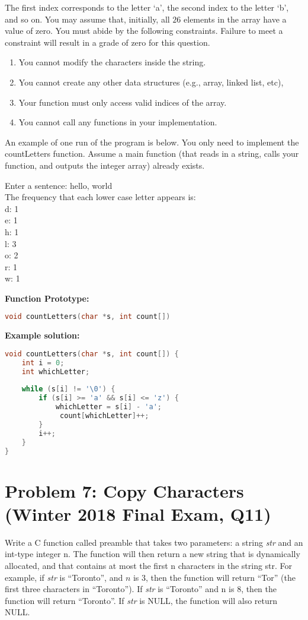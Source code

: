 \documentclass[12pt]{article}
\begin{document}
The first index corresponds to the letter `a’, the second index to the letter `b’, and so on. You may assume that, initially, all $26$ elements in the array have a value of zero. You must abide by the following constraints. Failure to meet a constraint will result in a grade of zero for this question.
\begin{enumerate}
\item  You cannot modify the characters inside the string.
\item You cannot create any other data structures (e.g., array, linked list, etc), 
\item Your function must only access valid indices of the array.
\item You cannot call any functions in your implementation.
\end{enumerate}

An example of one run of the program is below. You only need to implement the countLetters function. Assume a main function (that reads in a string, calls your function, and outputs the integer array) already exists.

\begin{tcolorbox}[colback=gray!10, boxrule=0pt, sharp corners, enhanced jigsaw, left=3mm, right=3mm, top=1mm, bottom=1mm]
Enter a sentence: hello, world\\
The frequency that each lower case letter appears is:\\
d: 1\\
e: 1\\
h: 1\\
l: 3\\
o: 2\\
 r: 1\\
w: 1\\
\end{tcolorbox}
\textbf{Function Prototype:}
\begin{lstlisting}[language=C]
void countLetters(char *s, int count[]) 
\end{lstlisting}


\textbf{Example solution:}
\begin{lstlisting}[language=C]
void countLetters(char *s, int count[]) { 
	int i = 0;
	int whichLetter;
	
	while (s[i] != '\0') {
		if (s[i] >= 'a' && s[i] <= 'z') { 
			whichLetter = s[i] - 'a';
			 count[whichLetter]++;
		}
		i++; 
	}
}
\end{lstlisting}

\section*{Problem 7: Copy Characters (Winter 2018 Final Exam, Q11)}
Write a C function called preamble that takes two parameters: a string \textit{str} and an int-type integer n. The function will then return a new string that is dynamically allocated, and that contains at most the first n characters in the string str. For example, if \textit{str} is ``Toronto”, and $n$ is $3$, then the function will return ``Tor” (the first three characters in ``Toronto”). If \textit{str} is ``Toronto” and n is $8$, then the function will return ``Toronto”. If \textit{str} is NULL, the function will also return NULL.
\end{document}
